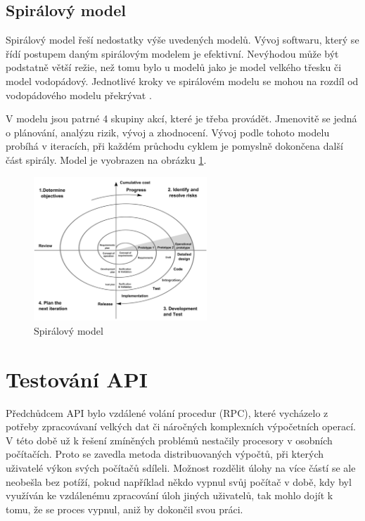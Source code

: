 \subsection{Spirálový model}
Spirálový model řeší nedostatky výše uvedených modelů. Vývoj softwaru, který se řídí postupem daným spirálovým modelem je efektivní. Nevýhodou může být podstatně větší režie, než tomu bylo u modelů jako je model velkého třesku či model vodopádový. Jednotlivé kroky ve spirálovém modelu se mohou na rozdíl od vodopádového modelu překrývat \cite{Patton2002}.

V modelu jsou patrné 4 skupiny akcí, které je třeba provádět. Jmenovitě se jedná o plánování, analýzu rizik, vývoj a zhodnocení. Vývoj podle tohoto modelu probíhá v iteracích, při každém průchodu cyklem je pomyslně dokončena další část spirály. Model je vyobrazen na obrázku \ref{fig:spiral-model}.


\begin{figure}[!h]
	\centering
	\includegraphics[width=0.58\textwidth]{Figures/Spiral_model.pdf}
	\caption{Spirálový model \cite{ee27bbyhk5LP1Ekm}}
	\label{fig:spiral-model}
\end{figure}

\newpage
\section{Testování API}
Předchůdcem API bylo vzdálené volání procedur (RPC), které vycházelo z potřeby zpracovávaní velkých dat či náročných komplexních výpočetních operací. V této době už k řešení zmíněných problémů nestačily procesory v osobních počítačích. Proto se zavedla metoda distribuovaných výpočtů, při kterých uživatelé výkon svých počítačů sdíleli. Možnost rozdělit úlohy na více částí se ale neobešla bez potíží, pokud například někdo vypnul svůj počítač v době, kdy byl využíván ke vzdálenému zpracování úloh jiných uživatelů, tak mohlo dojít k tomu, že se proces vypnul, aniž by dokončil svou práci.

